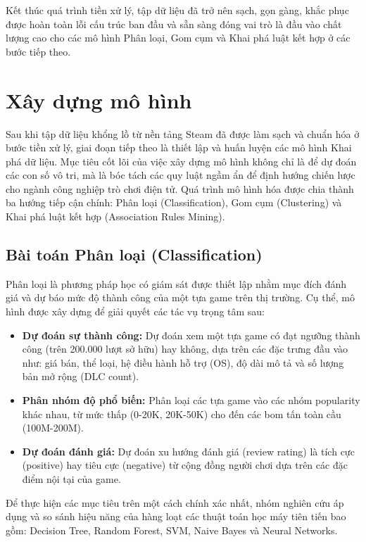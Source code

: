 \hspace{1cm} Kết thúc quá trình tiền xử lý, tập dữ liệu đã trở nên sạch, gọn gàng, khắc phục được hoàn toàn lỗi cấu trúc ban đầu và sẵn sàng đóng vai trò là đầu vào chất lượng cao cho các mô hình Phân loại, Gom cụm và Khai phá luật kết hợp ở các bước tiếp theo.





\newpage
\section{Xây dựng mô hình}
\hspace{1cm} Sau khi tập dữ liệu khổng lồ từ nền tảng Steam đã được làm sạch và chuẩn hóa ở bước tiền xử lý, giai đoạn tiếp theo là thiết lập và huấn luyện các mô hình Khai phá dữ liệu. Mục tiêu cốt lõi của việc xây dựng mô hình không chỉ là để dự đoán các con số vô tri, mà là bóc tách các quy luật ngầm ẩn để định hướng chiến lược cho ngành công nghiệp trò chơi điện tử. Quá trình mô hình hóa được chia thành ba hướng tiếp cận chính: Phân loại (Classification), Gom cụm (Clustering) và Khai phá luật kết hợp (Association Rules Mining).

\subsection{Bài toán Phân loại (Classification)}
\hspace{1cm} Phân loại là phương pháp học có giám sát được thiết lập nhằm mục đích đánh giá và dự báo mức độ thành công của một tựa game trên thị trường. Cụ thể, mô hình được xây dựng để giải quyết các tác vụ trọng tâm sau:
\begin{itemize}
    \item \textbf{Dự đoán sự thành công:} Dự đoán xem một tựa game có đạt ngưỡng thành công (trên 200.000 lượt sở hữu) hay không, dựa trên các đặc trưng đầu vào như: giá bán, thể loại, hệ điều hành hỗ trợ (OS), độ dài mô tả và số lượng bản mở rộng (DLC count).
    \item \textbf{Phân nhóm độ phổ biến:} Phân loại các tựa game vào các nhóm popularity khác nhau, từ mức thấp (0-20K, 20K-50K) cho đến các bom tấn toàn cầu (100M-200M).
    \item \textbf{Dự đoán đánh giá:} Dự đoán xu hướng đánh giá (review rating) là tích cực (positive) hay tiêu cực (negative) từ cộng đồng người chơi dựa trên các đặc điểm nội tại của game.
\end{itemize}
\hspace{1cm} Để thực hiện các mục tiêu trên một cách chính xác nhất, nhóm nghiên cứu áp dụng và so sánh hiệu năng của hàng loạt các thuật toán học máy tiên tiến bao gồm: Decision Tree, Random Forest, SVM, Naive Bayes và Neural Networks.

